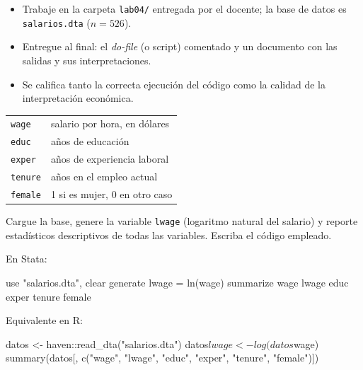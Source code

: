 \documentclass{academic-exam}
\begin{document}
\membrete

\begin{instrucciones}
\begin{itemize}
  \item Trabaje en la carpeta \texttt{lab04/} entregada por el docente;
        la base de datos es \texttt{salarios.dta} ($n = 526$).
  \item Entregue al final: el \emph{do-file} (o script) comentado y un
        documento con las salidas y sus interpretaciones.
  \item Se califica tanto la correcta ejecución del código como la
        calidad de la interpretación económica.
\end{itemize}
\end{instrucciones}

\begin{datos}
\begin{tabularx}{\linewidth}{@{}l X@{}}
  \texttt{wage}  & salario por hora, en dólares\\
  \texttt{educ}  & años de educación\\
  \texttt{exper} & años de experiencia laboral\\
  \texttt{tenure}& años en el empleo actual\\
  \texttt{female}& 1 si es mujer, 0 en otro caso\\
\end{tabularx}
\end{datos}

\begin{ejercicio}
Cargue la base, genere la variable \texttt{lwage} (logaritmo natural del
salario) y reporte estadísticos descriptivos de todas las variables.
Escriba el código empleado.

\recuadrorespuesta{4.5cm}
\begin{solucion}
En Stata:
\begin{codigo}[language=Stata]
use "salarios.dta", clear
generate lwage = ln(wage)
summarize wage lwage educ exper tenure female
\end{codigo}
Equivalente en R:
\begin{codigo}[language=R]
datos <- haven::read_dta("salarios.dta")
datos$lwage <- log(datos$wage)
summary(datos[, c("wage", "lwage", "educ", "exper", "tenure", "female")])
\end{codigo}
\end{solucion}
\end{ejercicio}
\end{document}
